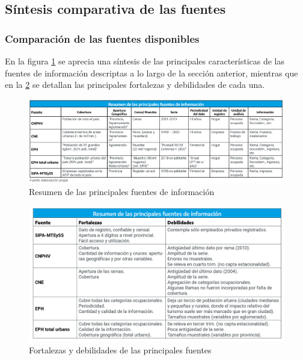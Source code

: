 \documentclass[
  openany]{book}
\begin{document}
\hypertarget{suxedntesis-comparativa-de-las-fuentes}{%
\subsection{Síntesis comparativa de las fuentes}\label{suxedntesis-comparativa-de-las-fuentes}}

\hypertarget{comparaciuxf3n-de-las-fuentes-disponibles}{%
\subsubsection{Comparación de las fuentes disponibles}\label{comparaciuxf3n-de-las-fuentes-disponibles}}

En la figura \ref{fig:empleofuentes1} se aprecia una síntesis de las principales características de las fuentes de información descriptas a lo largo de la sección anterior, mientras que en la \ref{fig:empleofuentes2} se detallan las principales fortalezas y debilidades de cada una.

\begin{figure}

{\centering \includegraphics[width=0.8\linewidth]{imagenes/figura3.1} 

}

\caption{Resumen de las principales fuentes de información}\label{fig:empleofuentes1}
\end{figure}

\begin{figure}

{\centering \includegraphics[width=0.8\linewidth]{imagenes/figura3.2} 

}

\caption{Fortalezas y debilidades de las principales fuentes}\label{fig:empleofuentes2}
\end{figure}
\end{document}
